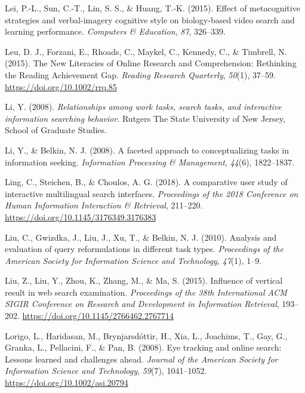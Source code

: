 \documentclass[letterpaper, nobind]{templates/ociamthesis}
\newlength{\cslhangindent}
\newenvironment{CSLReferences}[2] %
 {%
  \setlength{\parindent}{0pt}
  \ifodd #1
  \let\oldpar\par
  \def\par{\hangindent=\cslhangindent\oldpar}
  \fi
  \setlength{\parskip}{1mm}
  \setlength{\baselineskip}{6mm}
 }%
 {}
\begin{document}
\begin{CSLReferences}{1}{0}
\leavevmode{}%
Lei, P.-L., Sun, C.-T., Lin, S. S., \& Huang, T.-K. (2015). Effect of metacognitive strategies and verbal-imagery cognitive style on biology-based video search and learning performance. \emph{Computers \& Education}, \emph{87}, 326--339.

\leavevmode{}%
Leu, D. J., Forzani, E., Rhoads, C., Maykel, C., Kennedy, C., \& Timbrell, N. (2015). The {New Literacies} of {Online Research} and {Comprehension}: Rethinking the {Reading Achievement Gap}. \emph{Reading Research Quarterly}, \emph{50}(1), 37--59. \url{https://doi.org/10.1002/rrq.85}

\leavevmode{}%
Li, Y. (2008). \emph{Relationships among work tasks, search tasks, and interactive information searching behavior}. Rutgers The State University of New Jersey, School of Graduate Studies.

\leavevmode{}%
Li, Y., \& Belkin, N. J. (2008). A faceted approach to conceptualizing tasks in information seeking. \emph{Information Processing \& Management}, \emph{44}(6), 1822--1837.

\leavevmode{}%
Ling, C., Steichen, B., \& Choulos, A. G. (2018). A comparative user study of interactive multilingual search interfaces. \emph{Proceedings of the 2018 Conference on Human Information Interaction \& Retrieval}, 211--220. \url{https://doi.org/10.1145/3176349.3176383}

\leavevmode{}%
Liu, C., Gwizdka, J., Liu, J., Xu, T., \& Belkin, N. J. (2010). Analysis and evaluation of query reformulations in different task types. \emph{Proceedings of the American Society for Information Science and Technology}, \emph{47}(1), 1--9.

\leavevmode{}%
Liu, Z., Liu, Y., Zhou, K., Zhang, M., \& Ma, S. (2015). Influence of vertical result in web search examination. \emph{Proceedings of the 38th International {ACM SIGIR} Conference on Research and Development in Information Retrieval}, 193--202. \url{https://doi.org/10.1145/2766462.2767714}

\leavevmode{}%
Lorigo, L., Haridasan, M., Brynjarsdóttir, H., Xia, L., Joachims, T., Gay, G., Granka, L., Pellacini, F., \& Pan, B. (2008). Eye tracking and online search: {Lessons} learned and challenges ahead. \emph{Journal of the American Society for Information Science and Technology}, \emph{59}(7), 1041--1052. \url{https://doi.org/10.1002/asi.20794}


\end{CSLReferences}
\end{document}
